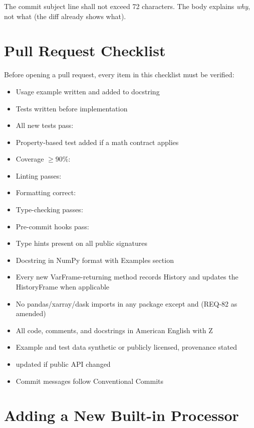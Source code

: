The commit subject line shall not exceed 72 characters. The body
explains \emph{why}, not what (the diff already shows what).

\section{Pull Request Checklist}

Before opening a pull request, every item in this checklist must be
verified:

\begin{itemize}[leftmargin=2.5em,label=$\square$]
  \item Usage example written and added to docstring
  \item Tests written before implementation
  \item All new tests pass: 
  \item Property-based test added if a math contract applies
  \item Coverage $\ge 90\%$: 
  \item Linting passes: 
  \item Formatting correct: 
  \item Type-checking passes: 
  \item Pre-commit hooks pass: 
  \item Type hints present on all public signatures
  \item Docstring in NumPy format with Examples section
  \item Every new VarFrame-returning method records History and updates
        the HistoryFrame when applicable
  \item No pandas/xarray/dask imports in any package except 
        and  (REQ-82 as amended)
  \item All code, comments, and docstrings in American English with Z
  \item Example and test data synthetic or publicly licensed, provenance stated
  \item {} updated if public API changed
  \item Commit messages follow Conventional Commits
\end{itemize}

\section{Adding a New Built-in Processor}

